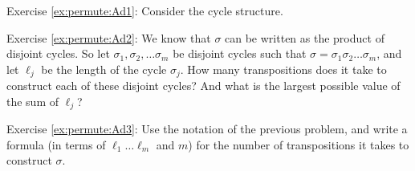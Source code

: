 \noindent Exercise \ref{ex:permute:Ad1}: Consider the cycle structure.

\noindent Exercise \ref{ex:permute:Ad2}: We know that $\sigma$ can be written as the product of disjoint cycles. So let $\sigma_1, \sigma_2, \ldots \sigma_m$ be disjoint cycles such that  $\sigma = \sigma_1 \sigma_2 \ldots \sigma_m$, and let $\ell_j$ be the length of the cycle $\sigma_j$. How many transpositions does it take to construct each of these disjoint cycles? And what is the largest possible value of the sum of $\ell_j$?

\noindent Exercise \ref{ex:permute:Ad3}: Use the notation of the previous problem, and write a formula (in terms of $\ell_1 \ldots \ell_m$ and $m$) for the number of transpositions it takes to construct $\sigma$.
